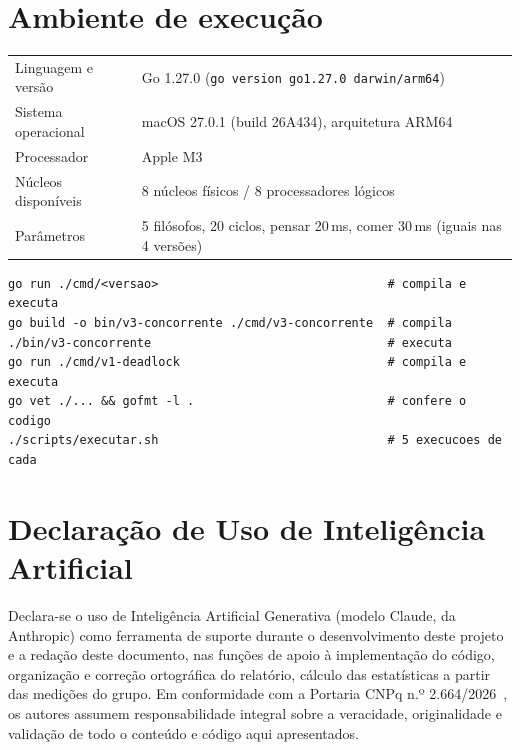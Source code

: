 \documentclass[11pt,a4paper]{article}
\begin{document}
\section*{Ambiente de execução}

\begin{tabularx}{\textwidth}{@{}lY@{}}
\toprule
Linguagem e versão & Go 1.27.0 (\texttt{go version go1.27.0 darwin/arm64}) \\
Sistema operacional & macOS 27.0.1 (build 26A434), arquitetura ARM64 \\
Processador & Apple M3 \\
Núcleos disponíveis & 8 núcleos físicos / 8 processadores lógicos \\
Parâmetros & 5 filósofos, 20 ciclos, pensar 20\,ms, comer 30\,ms (iguais nas 4 versões) \\
\bottomrule
\end{tabularx}

\begin{lstlisting}
go run ./cmd/<versao>                                # compila e executa
go build -o bin/v3-concorrente ./cmd/v3-concorrente  # compila
./bin/v3-concorrente                                 # executa
go run ./cmd/v1-deadlock                             # compila e executa
go vet ./... && gofmt -l .                           # confere o codigo
./scripts/executar.sh                                # 5 execucoes de cada
\end{lstlisting}

\section*{Declaração de Uso de Inteligência Artificial}

Declara-se o uso de Inteligência Artificial Generativa (modelo Claude, da Anthropic) como ferramenta
de suporte durante o desenvolvimento deste projeto e a redação deste documento, nas funções de apoio
à implementação do código, organização e correção ortográfica do relatório, cálculo das estatísticas a partir das
medições do grupo. Em conformidade com a Portaria CNPq n.º 2.664/2026~\cite{cnpq2026},
os autores assumem responsabilidade integral sobre a veracidade, originalidade e validação de todo o
conteúdo e código aqui apresentados.
\end{document}
